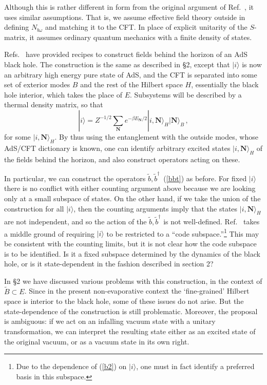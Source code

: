 \documentclass[12pt]{article}
\newcommand{\be}{\begin{equation}}
\newcommand{\ee}{\end{equation}}
\begin{document}
{{Although this is rather different in form from the original argument of Ref.~\cite{Almheiri:2012rt}, it uses similar assumptions.  That is, we assume effective field theory outside in defining $N_{b\omega}$ and matching it to the CFT.  In place of explicit unitarity of the $S$-matrix, it assumes ordinary quantum mechanics with a finite density of states.

Refs.~\cite{Papadodimas:2012aq,Verlinde:2012cy} have provided recipes to construct fields behind the horizon of an AdS black hole.  The construction is the same as described in \S2, except that $|i\rangle$ is now an arbitrary high energy pure state of AdS, and the CFT is separated into some set of exterior modes $B$ and the rest of the Hilbert space $H$, essentially the black hole interior, which takes the place of $E$. Subsystems will be described by a thermal density matrix, so that
\be
|i\rangle = Z^{-1/2} \sum_{\pmb N} e^{-\beta E_{\pmb N}/2} |i, {\pmb N} \rangle_{H}  |{\pmb N}\rangle_B \,,
\label{entangle}
\ee
for some $|i, {\pmb N} \rangle_{H}$.  By thus using the entanglement with the outside modes, whose AdS/CFT dictionary is known, one can identify arbitrary excited states $|i, {\pmb N} \rangle_H$ of the fields behind the horizon, and also construct operators acting on these.}

In particular, we can construct the operators $\tilde b, \tilde b^\dagger$~(\ref{bbt}) as before.  For fixed $|i \rangle$ there is no conflict with either counting argument above because we are looking only at a small subspace of states.  On the other hand, if we take the union of the construction for all $|i \rangle$, then the counting arguments imply that the states $|i, {\pmb N} \rangle_{H}$ are not independent, and so the action of the $\tilde b, \tilde b^\dagger$ is not well-defined.  Ref.~\cite{Verlinde:2012cy} takes a middle ground of requiring $|i\rangle$ to be restricted to a ``code subspace.''\footnote{Due to the dependence of (\ref{b2}) on $|i\rangle$, one must in fact identify a preferred basis in this subspace.}  This may be consistent with the counting limits, but it is not clear how the code subspace is to be identified.  Is it a fixed subspace determined by the dynamics of the black hole, or is it state-dependent in the fashion described in section 2?


In \S2 we have discussed various problems with this construction, in the context of $\tilde B \subset E$.  {Since in the present non-evaporative context the `fine-grained' Hilbert space is interior to the black hole, some of these issues do not arise. But} the state-dependence of the construction is still problematic.  {Moreover, the proposal is ambiguous}: if we act on an infalling vacuum state with a unitary transformation, we can interpret the resulting state either as an excited state of the original vacuum, or as a vacuum state in its own right.

}
\end{document}
